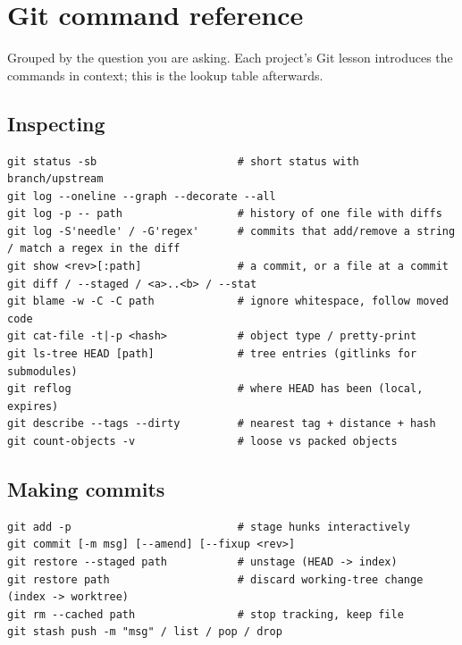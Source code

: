 \chapter{Git command reference}
\label{app:git}

Grouped by the question you are asking. Each project's Git lesson introduces the commands in context; this is the lookup table afterwards.

\section*{Inspecting}
\begin{lstlisting}[style=sh]
git status -sb                      # short status with branch/upstream
git log --oneline --graph --decorate --all
git log -p -- path                  # history of one file with diffs
git log -S'needle' / -G'regex'      # commits that add/remove a string / match a regex in the diff
git show <rev>[:path]               # a commit, or a file at a commit
git diff / --staged / <a>..<b> / --stat
git blame -w -C -C path             # ignore whitespace, follow moved code
git cat-file -t|-p <hash>           # object type / pretty-print
git ls-tree HEAD [path]             # tree entries (gitlinks for submodules)
git reflog                          # where HEAD has been (local, expires)
git describe --tags --dirty         # nearest tag + distance + hash
git count-objects -v                # loose vs packed objects
\end{lstlisting}

\section*{Making commits}
\begin{lstlisting}[style=sh]
git add -p                          # stage hunks interactively
git commit [-m msg] [--amend] [--fixup <rev>]
git restore --staged path           # unstage (HEAD -> index)
git restore path                    # discard working-tree change (index -> worktree)
git rm --cached path                # stop tracking, keep file
git stash push -m "msg" / list / pop / drop
\end{lstlisting}

